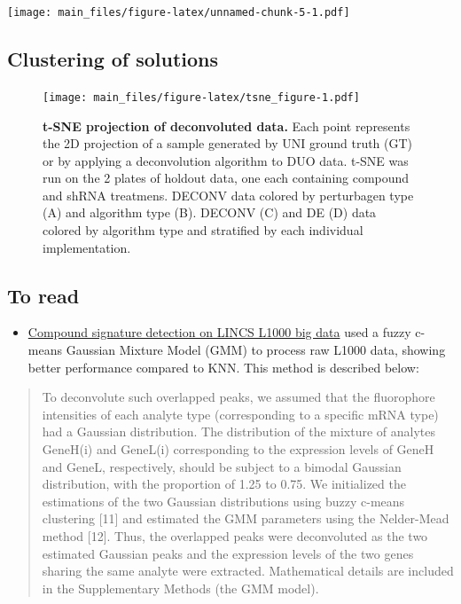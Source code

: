 \documentclass[]{article}
\providecommand{\tightlist}{%
  \setlength{\itemsep}{0pt}\setlength{\parskip}{0pt}}
\begin{document}
\texttt{[image: main\_files/figure-latex/unnamed-chunk-5-1.pdf]}

\hypertarget{clustering-of-solutions}{%
\subsection{Clustering of solutions}\label{clustering-of-solutions}}

\begin{figure}
\centering
\texttt{[image: main\_files/figure-latex/tsne\_figure-1.pdf]}
\caption{\label{tsne_figure}\textbf{t-SNE projection of deconvoluted
data.} Each point represents the 2D projection of a sample generated by
UNI ground truth (GT) or by applying a deconvolution algorithm to DUO
data. t-SNE was run on the 2 plates of holdout data, one each containing
compound and shRNA treatmens. DECONV data colored by perturbagen type
(A) and algorithm type (B). DECONV (C) and DE (D) data colored by
algorithm type and stratified by each individual implementation.}
\end{figure}

\clearpage

\hypertarget{to-read}{%
\subsection{To read}\label{to-read}}

\begin{itemize}
\tightlist
\item
  \href{https://pubs.rsc.org/en/content/getauthorversionpdf/c4mb00677a}{Compound
  signature detection on LINCS L1000 big data} used a fuzzy c-means
  Gaussian Mixture Model (GMM) to process raw L1000 data, showing better
  performance compared to KNN. This method is described below:
\end{itemize}

\begin{quote}
To deconvolute such overlapped peaks, we assumed that the fluorophore
intensities of each analyte type (corresponding to a specific mRNA type)
had a Gaussian distribution. The distribution of the mixture of analytes
GeneH(i) and GeneL(i) corresponding to the expression levels of GeneH
and GeneL, respectively, should be subject to a bimodal Gaussian
distribution, with the proportion of 1.25 to 0.75. We initialized the
estimations of the two Gaussian distributions using buzzy c-means
clustering {[}11{]} and estimated the GMM parameters using the
Nelder-Mead method {[}12{]}. Thus, the overlapped peaks were
deconvoluted as the two estimated Gaussian peaks and the expression
levels of the two genes sharing the same analyte were extracted.
Mathematical details are included in the Supplementary Methods (the GMM
model).
\end{quote}
\end{document}
